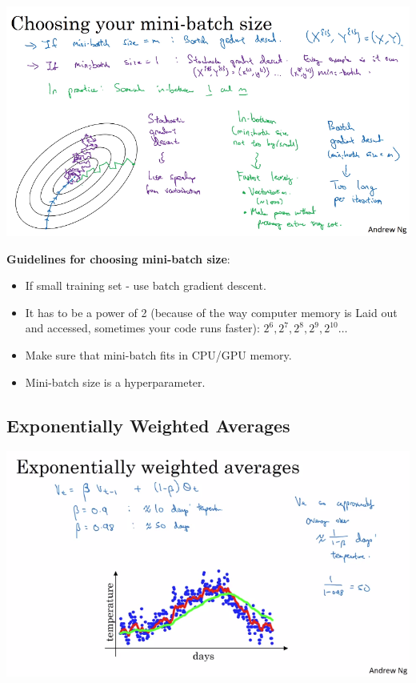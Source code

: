 \documentclass{article}
\begin{document}
\begin{center}
\includegraphics[scale=0.4]{./images/mini_batch.png}
\end{center}

\noindent \textbf{Guidelines for choosing mini-batch size}:

\begin{itemize}
  \item If small training set - use batch gradient descent.
  \item It has to be a power of 2 (because of the way computer memory is Laid out and accessed, sometimes your code runs faster): \(2^{6}, 2^{7}, 2^{8}, 2^{9}, 2^{10} \dots\)
  \item Make sure that mini-batch fits in CPU/GPU memory.
  \item Mini-batch size is a hyperparameter.
\end{itemize}

\subsection{Exponentially Weighted Averages}

\begin{center}
\includegraphics[scale=0.4]{./images/exponentially_weighted_average.png}
\end{center}
\end{document}
